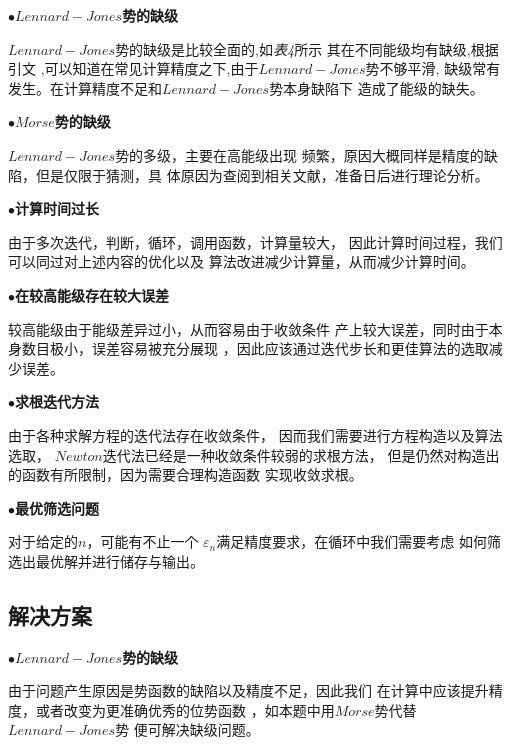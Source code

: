 \documentclass[11pt, a4paper, oneside]{ctexart}
\begin{document}
{{{{    {\vspace{5mm}
    $\bullet${\bfseries{$Lennard-Jones$势的缺级}}
    \par $Lennard-Jones$势的缺级是比较全面的,如\emph{表4}所示
    其在不同能级均有缺级,根据引文\cite{a}\cite{b}\cite{c}
    ,可以知道在常见计算精度之下,由于$Lennard-Jones$势不够平滑,
    缺级常有发生。在计算精度不足和$Lennard-Jones$势本身缺陷下
    造成了能级的缺失。
    }


    {\vspace{5mm}
    $\bullet${\bfseries{$Morse$势的缺级}}
    \par $Lennard-Jones$势的多级，主要在高能级出现
    频繁，原因大概同样是精度的缺陷，但是仅限于猜测，具
    体原因为查阅到相关文献，准备日后进行理论分析。
    }

    {
    \vspace{5mm}
    $\bullet${\bfseries{计算时间过长}}
    \par 由于多次迭代，判断，循环，调用函数，计算量较大，
    因此计算时间过程，我们可以同过对上述内容的优化以及
    算法改进减少计算量，从而减少计算时间。
    }

    {
    \vspace{5mm}
    $\bullet${\bfseries{在较高能级存在较大误差}}
    \par 较高能级由于能级差异过小，从而容易由于收敛条件
    产上较大误差，同时由于本身数目极小，误差容易被充分展现
    ，因此应该通过迭代步长和更佳算法的选取减少误差。
    }

    {
    \vspace{5mm}
    $\bullet${\bfseries{求根迭代方法}}
    \par 由于各种求解方程的迭代法存在收敛条件，
    因而我们需要进行方程构造以及算法选取，
    $Newton$迭代法已经是一种收敛条件较弱的求根方法，
    但是仍然对构造出的函数有所限制，因为需要合理构造函数
    实现收敛求根。
    }

    {
    \vspace{5mm}
    $\bullet${\bfseries{最优筛选问题}}
    \par 对于给定的$n$，可能有不止一个
    $\varepsilon_n$满足精度要求，在循环中我们需要考虑
    如何筛选出最优解并进行储存与输出。
    }

    
}
\subsection{解决方案}
{


    {\vspace{5mm}
    $\bullet${\bfseries{$Lennard-Jones$势的缺级}}
    \par 由于问题产生原因是势函数的缺陷以及精度不足，因此我们
    在计算中应该提升精度，或者改变为更准确优秀的位势函数
    ，如本题中用$Morse$势代替$Lennard-Jones$势
    便可解决缺级问题。
    }


}}}}
\end{document}

